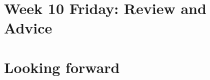 \newpage
\section*{Week 10 Friday: Review and Advice}

\newpage

\newpage

\newpage

\newpage

\newpage

\newpage


\section*{Looking forward}

